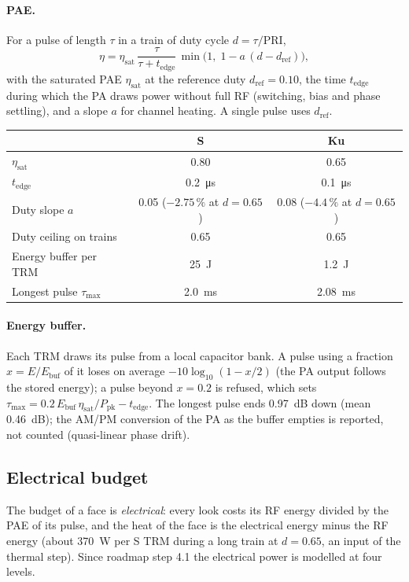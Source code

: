 \documentclass[11pt,a4paper]{article}
\begin{document}
\paragraph{PAE.} For a pulse of length $\tau$ in a train of duty cycle $d = \tau/\mathrm{PRI}$,
\[
  \eta = \eta_{\mathrm{sat}}\,\frac{\tau}{\tau + t_{\mathrm{edge}}}\,\min\bigl(1,\;1 - a\,(d - d_{\mathrm{ref}})\bigr),
\]
with the saturated PAE $\eta_{\mathrm{sat}}$ at the reference duty $d_{\mathrm{ref}} = 0.10$, the time $t_{\mathrm{edge}}$
during which the PA draws power without full RF (switching, bias and phase settling), and a slope $a$ for channel
heating. A single pulse uses $d_{\mathrm{ref}}$.

\begin{center}
\begin{tabular}{@{}lcc@{}}
\toprule
 & S & Ku\\
\midrule
$\eta_{\mathrm{sat}}$ & 0.80 & 0.65\\
$t_{\mathrm{edge}}$ & \SI{0.2}{\micro s} & \SI{0.1}{\micro s}\\
Duty slope $a$ & 0.05 ($-2.75\,\%$ at $d=0.65$) & 0.08 ($-4.4\,\%$ at $d=0.65$)\\
Duty ceiling on trains & 0.65 & 0.65\\
Energy buffer per TRM & \SI{25}{J} & \SI{1.2}{J}\\
Longest pulse $\tau_{\max}$ & \SI{2.0}{ms} & \SI{2.08}{ms}\\
\bottomrule
\end{tabular}
\end{center}

\paragraph{Energy buffer.} Each TRM draws its pulse from a local capacitor bank. A pulse using a fraction
$x = E/E_{\mathrm{buf}}$ of it loses on average $-10\log_{10}(1-x/2)$ (the PA output follows the stored energy); a
pulse beyond $x = 0.2$ is refused, which sets
$\tau_{\max} = 0.2\,E_{\mathrm{buf}}\,\eta_{\mathrm{sat}}/P_{\mathrm{pk}} - t_{\mathrm{edge}}$. The longest pulse ends
\SI{0.97}{dB} down (mean \SI{0.46}{dB}); the AM/PM conversion of the PA as the buffer empties is reported, not
counted (quasi-linear phase drift).

\subsection{Electrical budget}\label{sec:power}
The budget of a face is \emph{electrical}: every look costs its RF energy divided by the PAE of its pulse, and the heat
of the face is the electrical energy minus the RF energy (about \SI{370}{W} per S TRM during a long train at
$d = 0.65$, an input of the thermal step). Since roadmap step 4.1 the electrical power is modelled at four levels.
\end{document}
